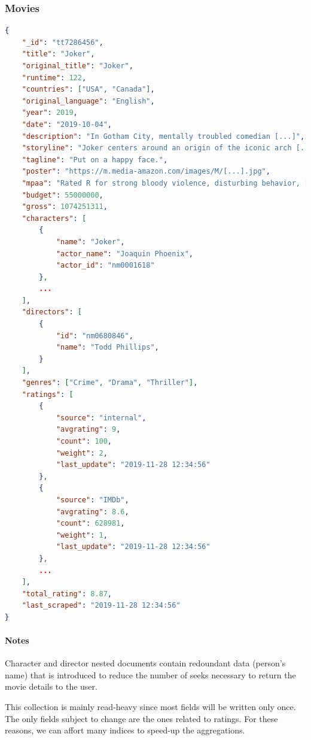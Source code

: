\documentclass[11pt]{article}
\begin{document}
\subsubsection{Movies}
\label{sec:movies}

\begin{lstlisting}[language=json]	
{
	"_id": "tt7286456",
	"title": "Joker",
	"original_title": "Joker",
	"runtime": 122,
	"countries": ["USA", "Canada"],
	"original_language": "English",
	"year": 2019,
	"date": "2019-10-04",
	"description": "In Gotham City, mentally troubled comedian [...]",
	"storyline": "Joker centers around an origin of the iconic arch [...]",
	"tagline": "Put on a happy face.",
	"poster": "https://m.media-amazon.com/images/M/[...].jpg",
	"mpaa": "Rated R for strong bloody violence, disturbing behavior, [...]",
	"budget": 55000000,
	"gross": 1074251311, 
	"characters": [
		{
			"name": "Joker",
			"actor_name": "Joaquin Phoenix",
			"actor_id": "nm0001618"
		},
		...
	],
	"directors": [
		{
			"id": "nm0680846",
			"name": "Todd Phillips",
		}
	],
	"genres": ["Crime", "Drama", "Thriller"],
	"ratings": [
		{
			"source": "internal",
			"avgrating": 9,
			"count": 100,
			"weight": 2,
			"last_update": "2019-11-28 12:34:56"
		},
		{
			"source": "IMDb",
			"avgrating": 8.6,
			"count": 628981,
			"weight": 1,
			"last_update": "2019-11-28 12:34:56"
		},
		...
	],
	"total_rating": 8.87,
	"last_scraped": "2019-11-28 12:34:56"
}
\end{lstlisting}

\paragraph{Notes}
Character and director nested documents contain redoundant data (person's name) that is introduced to reduce the number of seeks necessary to return the movie details
to the user.

This collection is mainly read-heavy since most fields will be written only once.
The only fields subject to change are the ones related to ratings. For these reasons,
we can affort many indices to speed-up the aggregations.
\end{document}
